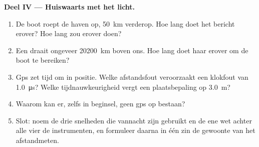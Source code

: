 \begin{problem}[{Weekendopgave --- de signalen van de wereld lezen: één
wet, $d = v\,t$, meet een storm, brengt een zeebodem in kaart, telt een
hartslag en ontrafelt hoe gps werkt}]
\medskip
\noindent\textbf{Deel IV --- Huiswaarts met het licht.}
\begin{enumerate}[resume]
  \item De boot roept de haven op, \qty{50}{km} verderop. Hoe lang doet
        het bericht erover? Hoe lang zou  erover doen?
  \item Een  draait ongeveer \qty{20200}{km} boven ons.
        Hoe lang doet haar  erover om de boot te bereiken?
  \item Gps zet tijd om in positie. Welke afstandsfout veroorzaakt een
        klokfout van \qty{1.0}{\micro s}? Welke tijdnauwkeurigheid vergt
        een plaatsbepaling op \qty{3.0}{m}?
  \item Waarom kan er, zelfs in beginsel, geen gps op  bestaan?
  \item Slot: noem de drie snelheden die vannacht zijn gebruikt en de
        ene wet achter alle vier de instrumenten, en formuleer daarna in
        één zin de gewoonte van het afstandmeten.
\end{enumerate}
\end{problem}
